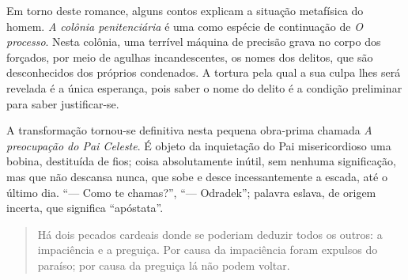 Em torno deste romance, alguns contos explicam a situação metafísica do homem. \textit{A colônia penitenciária} é uma como espécie de continuação de \textit{O
processo}. Nesta colônia, uma terrível máquina de precisão grava no corpo
dos forçados, por meio de agulhas incandescentes, os nomes dos delitos,
que são desconhecidos dos próprios condenados. A tortura pela qual a sua culpa lhes será revelada
é a única esperança, pois saber o nome do delito é a condição preliminar para
saber justificar-se.


A transformação tornou-se definitiva nesta pequena obra-prima chamada \textit{A preocupação do Pai Celeste}. É objeto da inquietação do Pai
misericordioso uma bobina, destituída de fios; coisa absolutamente inútil, sem nenhuma significação, mas
que não descansa nunca, que sobe e desce incessantemente a escada, até o
último dia. ``--- Como te chamas?'', ``--- Odradek''; palavra eslava, de
origem incerta, que significa ``apóstata''.


\begin{quote}
Há dois pecados cardeais donde se poderiam deduzir todos
os outros: a impaciência e a preguiça. Por causa da impaciência foram
expulsos do paraíso; por causa da preguiça lá não podem voltar. 
\end{quote}


